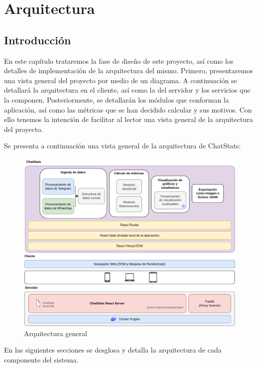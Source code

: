 \chapter{Arquitectura}
\label{chap:architecture}


\section{Introducción}
\label{sec:introduction}

En este capítulo trataremos la fase de diseño de este proyecto, así como los detalles de implementación de la arquitectura del mismo. Primero, presentaremos una vista general del proyecto por medio de un diagrama. A continuación se detallará la arquitectura en el cliente, así como la del servidor y los servicios que la componen. Posteriormente, se detallarán los módulos que conforman la aplicación, así como las métricas que se han decidido calcular y sus motivos. Con ello tenemos la intención de facilitar al lector una vista general de la arquitectura del proyecto.

Se presenta a continuación una vista general de la arquitectura de ChatStats:

\begin{figure}[H]
	\centering
	\includegraphics[width=\textwidth]{img/architecture.png}
	\caption{Arquitectura general}
	\label{fig:chap4:architecture_general}
\end{figure}

En las siguientes secciones se desglosa y detalla la arquitectura de cada componente del sistema.


